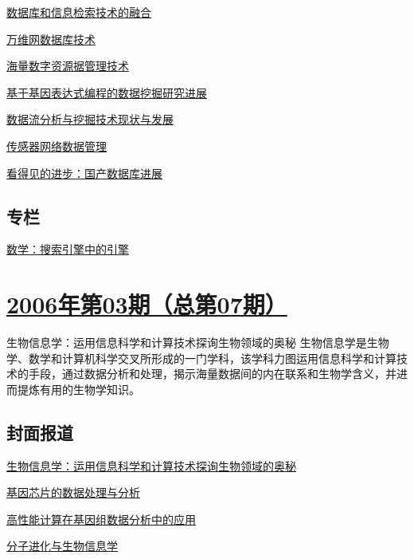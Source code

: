 \documentclass[a4paper]{article}
\begin{document}
\href{http://history.ccf.org.cn/resources/1190201776262/2010/04/15/008018.pdf}{数据库和信息检索技术的融合}

\href{http://history.ccf.org.cn/resources/1190201776262/2010/04/15/008025.pdf}{万维网数据库技术}

\href{http://history.ccf.org.cn/resources/1190201776262/2010/04/15/008039.pdf}{海量数字资源据管理技术}

\href{http://history.ccf.org.cn/resources/1190201776262/2010/04/15/008047.pdf}{基于基因表达式编程的数据挖掘研究进展}

\href{http://history.ccf.org.cn/resources/1190201776262/2010/04/15/008055.pdf}{数据流分析与挖掘技术现状与发展}

\href{http://history.ccf.org.cn/resources/1190201776262/2010/04/15/008065.pdf}{传感器网络数据管理}

\href{http://history.ccf.org.cn/resources/1190201776262/2010/04/15/008072.pdf}{看得见的进步：国产数据库进展}

\subsection{专栏}
\href{http://history.ccf.org.cn/resources/1190201776262/2010/04/15/008078.pdf}{数学：搜索引擎中的引擎}


\section{\href{http://history.ccf.org.cn/sites/ccf/jsjtbbd.jsp?contentId=2542567628938}{\textbf{2006年第03期（总第07期）}}}
生物信息学：运用信息科学和计算技术探询生物领域的奥秘 生物信息学是生物学、数学和计算机科学交叉所形成的一门学科，该学科力图运用信息科学和计算技术的手段，通过数据分析和处理，揭示海量数据间的内在联系和生物学含义，并进而提炼有用的生物学知识。
\subsection{封面报道}
\href{http://history.ccf.org.cn/resources/1190201776262/2010/04/15/007016.pdf}{生物信息学：运用信息科学和计算技术探询生物领域的奥秘}

\href{http://history.ccf.org.cn/resources/1190201776262/2010/04/15/007017.pdf}{基因芯片的数据处理与分析}

\href{http://history.ccf.org.cn/resources/1190201776262/2010/04/15/007028.pdf}{高性能计算在基因组数据分析中的应用}

\href{http://history.ccf.org.cn/resources/1190201776262/2010/04/15/007034.pdf}{分子进化与生物信息学}
\end{document}
